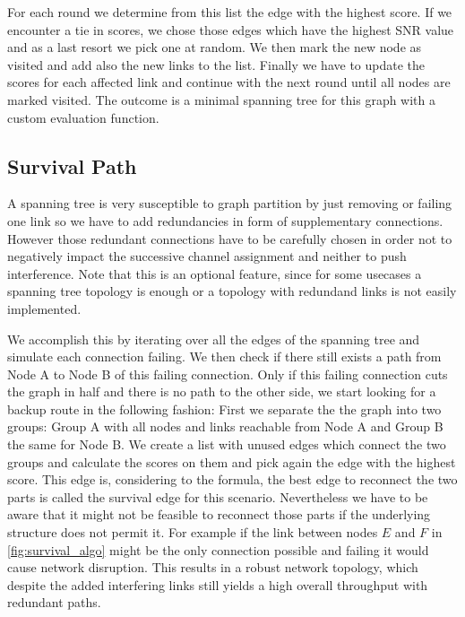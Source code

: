       For each round we determine from this list the edge with the highest score. If we encounter a tie in scores, we chose those edges which have the highest SNR value and as a last
      resort we pick one at random. We then mark the new node as visited and add also the new links to the list.
      Finally we have to update the scores for each affected link and continue with the next round until all nodes are marked visited.
      The outcome is a minimal spanning tree for this graph with a custom evaluation function.
      
    \subsection{Survival Path}
      A spanning tree is very susceptible to graph partition by just removing or failing one link so we have to add redundancies in form of supplementary connections.
      However those redundant connections have to be carefully chosen in order not to negatively impact the successive channel assignment and neither to push interference.
      Note that this is an optional feature, since for some usecases a spanning tree topology is enough or a topology with redundand links is not easily implemented.  
      
      We accomplish this by iterating over all the edges of the spanning tree and simulate each connection failing. We then check if there still exists 
      a path from Node A to Node B of this failing connection. Only if this failing connection cuts the graph in half and there is no path to the other side,
      we start looking for a backup route in the following fashion:
      First we separate the the graph into two groups: Group A with all nodes and links reachable from Node A and Group B the same for Node B.
      We create a list with unused edges which connect the two groups and calculate the scores on them and pick again the edge with the highest score.
      This edge is, considering to the formula, the best edge to reconnect the two parts is called the survival edge for this scenario.
      Nevertheless we have to be aware that it might not be feasible to reconnect those parts if the underlying structure does not permit it.
      For example if the link between nodes \(E\) and \(F\) in \ref{fig:survival_algo} might be the only connection possible and failing it would cause network disruption.
      This results in a robust network topology, which despite the added interfering links still yields a high overall throughput with redundant paths.
      
